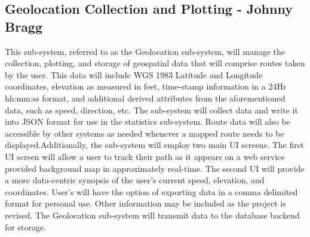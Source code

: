 ﻿\documentclass{article}
\begin{document}
\subsection{Geolocation Collection and Plotting - Johnny Bragg}
This sub-system, referred to as the Geolocation sub-system, will manage the collection, plotting, and storage of geospatial data that will comprise routes taken by the user. This data will include WGS 1983 Latitude and Longitude coordinates, elevation as measured in feet, time-stamp information in a 24Hr hh:mm:ss format, and additional derived attributes from the aforementioned data, such as speed, direction, etc.
The sub-system will collect data and write it into JSON format for use in the statistics sub-system. Route data will also be accessible by other systems as needed whenever a mapped route needs to be displayed.Additionally, the sub-system will employ two main UI screens. The first UI screen will allow a user to track their path as it appears on a web service provided background map in approximately real-time. The second UI will provide a more data-centric synopsis of the user’s current speed, elevation, and coordinates. User’s will have the option of exporting data in a comma delimited format for personal use. Other information may be included as the project is revised. The Geolocation sub-system will transmit data to the database backend for storage.
\end{document}

